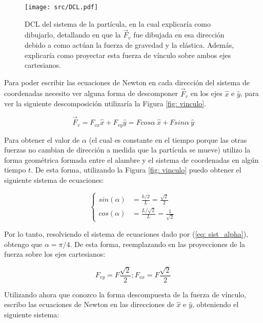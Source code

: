 \documentclass{article}
\begin{document}
\begin{multicols}{2}
\begin{figure}[H]
    \centering
    \texttt{[image: src/DCL.pdf]}
    \caption{
        DCL del sistema de la partícula, en la cual explicaría como dibujarlo, detallando en que la $\vec{F}_v$ fue dibujada en esa dirección debido a como actúan la fuerza de gravedad y la elástica. Además, explicaría como proyectar esta fuerza de vínculo sobre ambos ejes cartesianos.
    }
    \label{fig: DCL}
\end{figure}

Para poder escribir las ecuaciones de Newton en cada dirección del sistema de coordenadas necesito ver alguna forma de descomponer $\vec{F}_v$ en los ejes $\hat{x}$ e $\hat{y}$, para ver la siguiente descomposición utilizaría la Figura \ref{fig: vinculo}.

\begin{equation}
    \vec{F}_v = F_{vx} \hat{x} + F_{vy} \hat{y} = Fcos\alpha \ \hat{x} + Fsin\alpha \ \hat{y}
\end{equation}

Para obtener el valor de $\alpha$ (el cual es constante en el tiempo porque las otras fuerzas no cambian de dirección a medida que la partícula se mueve) utilizo la forma geométrica formada entre el alambre y el sistema de coordenadas en algún tiempo $t$. De esta forma, utilizando la Figura \ref{fig: vinculo} puedo obtener el siguiente sistema de ecuaciones:

\begin{equation}
\begin{cases}
    sin(\alpha) &= \frac{h/2}{L} = \frac{\sqrt{2}}{2} \\
    cos(\alpha) &= \frac{L/\sqrt{2}}{L} = \frac{1}{\sqrt{2}}
    \label{eq: sist_alpha}
\end{cases}
\end{equation}

Por lo tanto, resolviendo el sistema de ecuaciones dado por (\ref{eq: sist_alpha}), obtengo que $\alpha = \pi/4$. De esta forma, reemplazando en las proyecciones de la fuerza sobre los ejes cartesianos:

\begin{equation}
    F_{vy} = F \frac{\sqrt{2}}{2}; F_{vx} = F \frac{\sqrt{2}}{2}
\end{equation}

Utilizando ahora que conozco la forma descompuesta de la fuerza de vínculo, escribo las ecuaciones de Newton en las direcciones de $\hat{x}$ e $\hat{y}$, obteniendo el siguiente sistema:


\end{multicols}
\end{document}
